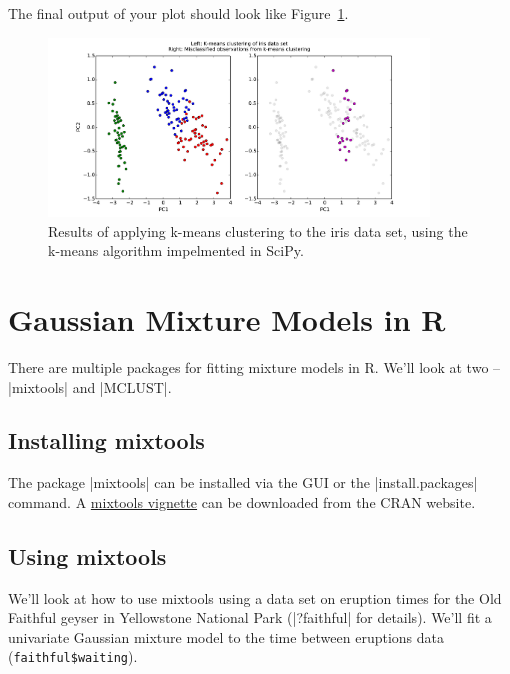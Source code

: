 The final output of your plot should look like Figure~\ref{fig:pykmeans}.

\begin{figure}[ht!]
  \centering
  \includegraphics[width=0.9\textwidth]{./fig-python-kmeans.pdf}
  \caption{Results of applying k-means clustering to the iris data set, using the k-means algorithm impelmented in SciPy.\label{fig:pykmeans}}
\end{figure}


\section{Gaussian Mixture Models in R}

There are multiple packages for fitting mixture models in R.  We'll look at two -- |mixtools| and |MCLUST|.

\subsection{Installing mixtools}

The package |mixtools| can be installed via the GUI or the |install.packages| command. A \href{http://cran.r-project.org/web/packages/mixtools/vignettes/vignette.pdf}{mixtools vignette} can be downloaded from the CRAN website.

\subsection{Using mixtools}

We'll look at how to use mixtools using a data set on eruption times for the Old Faithful geyser in Yellowstone National Park (|?faithful| for details). We'll fit a univariate Gaussian mixture model to the time between eruptions data (\verb|faithful$waiting|).

